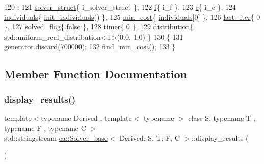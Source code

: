 \begin{DoxyCode}
120                                                                              :
121             \hyperlink{classea_1_1_solver__base_a5e1d821809f2d26c6f882942ad728127}{solver\_struct}\{ i\_solver\_struct \},
122             \hyperlink{classea_1_1_solver__base_ae0a893780c93dfe17c1d17301de6494f}{f}\{ i\_f \},
123             \hyperlink{classea_1_1_solver__base_a6914e89d30e7484f2b4af1783f0de8c3}{c}\{ i\_c \},
124             \hyperlink{classea_1_1_solver__base_ad75bc440d24a46e97694c7c889f2ecde}{individuals}\{ \hyperlink{classea_1_1_solver__base_a3220df901d0e61d3c49e6265640d94ae}{init\_individuals}() \},
125             \hyperlink{classea_1_1_solver__base_af745cded954be26280d842c1e7c7f989}{min\_cost}\{ \hyperlink{classea_1_1_solver__base_ad75bc440d24a46e97694c7c889f2ecde}{individuals}[0] \},
126             \hyperlink{classea_1_1_solver__base_a8f9a321eb87e57636cf0b0f3a57b6fc2}{last\_iter}\{ 0 \},
127             \hyperlink{classea_1_1_solver__base_a1cdb824e8df6d4a8f228820ea85c9b05}{solved\_flag}\{ \textcolor{keyword}{false} \},
128             \hyperlink{classea_1_1_solver__base_ab0f0690de4b612c20b40f1b69a0e2743}{timer}\{ 0 \},
129             \hyperlink{classea_1_1_solver__base_ae88f44b13e264e092d3bbaeca6b3bd19}{distribution}\{ std::uniform\_real\_distribution<T>(0.0, 1.0) \}
130         \{
131             \hyperlink{namespaceea_a385e8ca8ba4ae2f69dcfffa79f20c2ff}{generator}.discard(700000);
132             \hyperlink{classea_1_1_solver__base_ac69a6c714298054039acbbbf5d2eea23}{find\_min\_cost}();
133         \}
\end{DoxyCode}


\subsection{Member Function Documentation}
\mbox{\label{classea_1_1_solver__base_ae16049f3e8586c144165fa2916ccdbce}} 
\subsubsection{\texorpdfstring{display\+\_\+results()}{display\_results()}}
{\footnotesize\ttfamily template$<$typename Derived , template$<$ typename $>$ class S, typename T , typename F , typename C $>$ \\
std\+::stringstream \hyperlink{classea_1_1_solver__base}{ea\+::\+Solver\+\_\+base}$<$ Derived, S, T, F, C $>$\+::display\+\_\+results (\begin{DoxyParamCaption}{ }\end{DoxyParamCaption})\hspace{0.3cm}{\ttfamily [protected]}}



